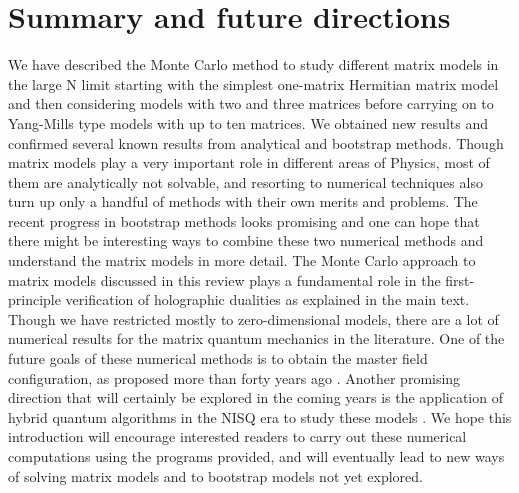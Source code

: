 \documentclass[letter,11pt]{article}
\begin{document}
\section{Summary and future directions}
We have described the Monte Carlo method to study different matrix models in the large N limit starting with the simplest one-matrix Hermitian matrix model and then considering models with two and three matrices before carrying on to Yang-Mills type models with up to ten matrices. We obtained new results and confirmed several known results from analytical and bootstrap methods. Though matrix models play a very important role in different areas of Physics, most of them are analytically not solvable, and resorting to numerical techniques also turn up only a handful of methods with their own merits and problems. The recent progress in bootstrap methods looks promising and one can hope that there might be interesting ways to combine these two numerical methods and understand the matrix models in more detail. The Monte Carlo approach to matrix models discussed in this review plays a fundamental role in the first-principle verification of holographic dualities as explained in the main text. Though we have restricted mostly to zero-dimensional models, there are a lot of numerical results for the matrix quantum mechanics in the literature. One of the future goals of these numerical methods is to obtain the master field configuration, as proposed more than forty years ago \cite{Coleman:1985rnk}. Another promising direction that will certainly be explored in the coming years is the application of hybrid quantum algorithms in the NISQ era to study these models  \cite{2018pres, Rinaldi:2021jbg}. We hope this introduction will encourage interested readers to carry out these numerical computations using the programs provided, and will eventually lead to new ways of solving matrix models and to bootstrap models not yet explored.
\vspace{8mm}
\end{document}
